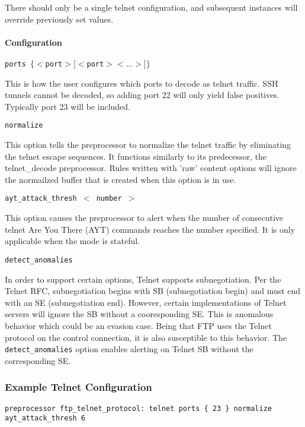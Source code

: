 \documentclass[english]{report}
\newcounter{slistnum}
\newenvironment{slist}
{ \begin{list}{ {\bf \arabic{slistnum}.} }{\usecounter{slistnum} } }
{ \end{list} }
\begin{document}
There should  only be a single telnet configuration, and subsequent instances
will override previously set values.

\paragraph{Configuration}
\begin{slist}
\item \texttt{ports $\{ <$port$> [<$port$> <...>] \}$}

This is how the user configures which ports to decode as telnet traffic.
SSH tunnels cannot be decoded, so adding port 22 will only yield false
positives.  Typically port 23 will be included.

\item \texttt{normalize}

This option tells the preprocessor to normalize the telnet traffic
by eliminating the telnet escape sequences.  It functions similarly
to its predecessor, the telnet\_decode preprocessor.  Rules written
with 'raw' content options will ignore the normailzed buffer that
is created when this option is in use.

\item \texttt{ayt\_attack\_thresh $<$ number $>$}

This option causes the preprocessor to alert when the number of consecutive
telnet Are You There (AYT) commands reaches the number specified.  It
is only applicable when the mode is stateful.

\item \texttt{detect\_anomalies}

In order to support certain options, Telnet supports subnegotiation. Per the
Telnet RFC, subnegotiation begins with SB (subnegotiation begin) and must
end with an SE (subnegotiation end). However, certain implementations of
Telnet servers will ignore the SB without a cooresponding SE. This is
anomalous behavior which could be an evasion case. Being that FTP uses the
Telnet protocol on the control connection, it is also susceptible to this
behavior. The \texttt{detect\_anomalies} option enables alerting on Telnet SB without
the corresponding SE.

\end{slist}

\subsubsection{Example Telnet Configuration}
\begin{verbatim}
preprocessor ftp_telnet_protocol: telnet ports { 23 } normalize ayt_attack_thresh 6
\end{verbatim}
\end{document}
